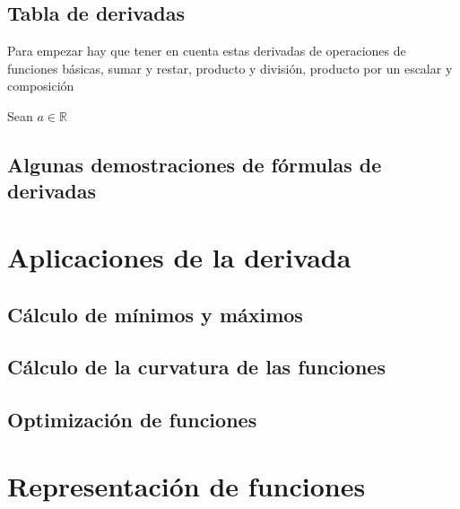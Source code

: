\newpage
\section{Tabla de derivadas}

Para empezar hay que tener en cuenta estas derivadas de operaciones de funciones básicas, sumar y restar, producto y división, producto por un escalar y composición

\noindent
Sean $a \in \mathbb{R}$ 

\section{Algunas demostraciones de fórmulas de derivadas}
\newpage

\chapter{Aplicaciones de la derivada}
\minitoc

\newpage
\section{Cálculo de mínimos y máximos}
\section{Cálculo de la curvatura de las funciones}
\section{Optimización de funciones}
\chapter{Representación de funciones}
\minitoc

\newpage
